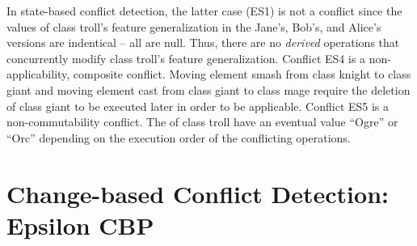 In state-based conflict detection, the latter case (ES1) is not a conflict since the values of class \textsf{troll}'s feature \textsf{generalization} in the Jane's, Bob's, and Alice's versions are indentical -- all are null. Thus, there are no \textit{derived} operations that concurrently modify class \textsf{troll}'s feature \textsf{generalization}. Conflict ES4 is a non-applicability, composite conflict. Moving element \textsf{smash} from class \textsf{knight} to class \textsf{giant} and moving element \textsf{cast} from class \textsf{giant} to class \textsf{mage} require the deletion of class \textsf{giant} to be executed later in order to be applicable. Conflict ES5 is a non-commutability conflict. The  of class \textsf{troll} have an eventual value ``Ogre'' or ``Orc'' depending on the execution order of the conflicting operations.

\section{Change-based Conflict Detection: Epsilon CBP}
\label{change_based_conflict_detection_epsilon_cbp}

